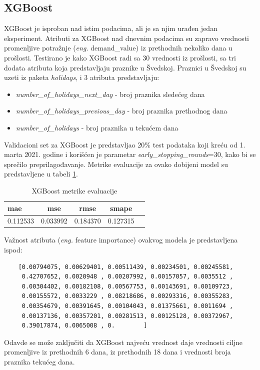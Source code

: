 \documentclass[12pt,oneside]{memoir}
\begin{document}
\subsection{XGBoost}
XGBoost je isproban nad istim podacima, ali je sa njim urađen jedan eksperiment. Atributi za XGBoost nad dnevnim podacima su zapravo vrednosti promenljive potražnje (\textit{eng.} demand\_value) iz prethodnih nekoliko dana u prošlosti. Testirano je kako XGBoost radi sa 30 vrednosti iz prošlosti, sa tri dodata atributa koja predstavljaju praznike u Švedskoj. Praznici u Švedskoj su uzeti iz paketa \textit{holidays}, i 3 atributa predstavljaju: 
\begin{itemize}
    \item \textit{number\_of\_holidays\_next\_day} - broj praznika sledećeg dana
    \item \textit{number\_of\_holidays\_previous\_day} - broj praznika prethodnog dana
    \item \textit{number\_of\_holidays} - broj praznika u tekućem dana
\end{itemize}
Validacioni set za XGBoost je predstavljao 20\% test podataka koji kreću od 1. marta 2021. godine i korišćen je parametar \textit{early\_stopping\_rounds}=30, kako bi se sprečilo preprilagođavanje. Metrike evaluacije za ovako dobijeni model su predstavljene u tabeli \ref{tbl: xgboost_1}. 
\begin{table}
\centering
\caption{XGBoost metrike evaluacije}
\label{tbl: xgboost_1}
\begin{tabular}{ |l|c|c|c|c|} 
\hline
mae & mse & rmse & smape \\
\hline
0.112533 & 0.033992 & 0.184370 & 0.127315 \\ 
\hline
\end{tabular}
\end{table}
Važnost atributa (\textit{eng.} feature importance) ovakvog modela je predstavljena ispod:
\begin{verbatim}
    [0.00794075, 0.00629401, 0.00511439, 0.00234501, 0.00245581,
     0.42707652, 0.0020948 , 0.00207992, 0.00157057, 0.0035512 ,
     0.00304402, 0.00182108, 0.00567753, 0.00143691, 0.00109723,
     0.00155572, 0.0033229 , 0.08218686, 0.00293316, 0.00355283,
     0.00354679, 0.00391645, 0.00104043, 0.01375661, 0.0011694 ,
     0.00137136, 0.00357201, 0.00281513, 0.00125128, 0.00372967,
     0.39017874, 0.0065008 , 0.        ]
\end{verbatim}
Odavde se može zaključiti da XGBoost najveću vrednost daje vrednosti ciljne promenljive iz prethodnih 6 dana, iz prethodnih 18 dana i vrednosti broja praznika tekućeg dana.
\end{document}

